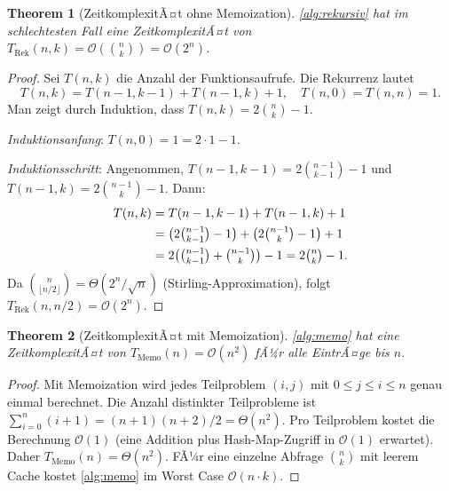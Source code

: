 ﻿\documentclass[12pt, a4paper]{article}
\newcommand{\Oh}{\mathcal{O}}
\theoremstyle{plain}
\newtheorem{theorem}{Theorem}[section]
\theoremstyle{definition}
\theoremstyle{remark}
\renewcommand{\Oh}{\mathcal{O}}
\begin{document}
\begin{theorem}[ZeitkomplexitÃ¤t ohne Memoization]
  \label{thm:rekursiv_zeit}
  \cref{alg:rekursiv} hat im schlechtesten Fall eine ZeitkomplexitÃ¤t
  von $T_{\text{Rek}}(n, k) = \Oh\!\left(\binom{n}{k}\right) = \Oh(2^n)$.
\end{theorem}

\begin{proof}
  Sei $T(n, k)$ die Anzahl der Funktionsaufrufe. Die Rekurrenz lautet
  \begin{equation}
    T(n, k) = T(n-1, k-1) + T(n-1, k) + 1,
    \quad T(n, 0) = T(n, n) = 1.
  \end{equation}
  Man zeigt durch Induktion, dass $T(n, k) = 2\binom{n}{k} - 1$.

  \emph{Induktionsanfang}: $T(n, 0) = 1 = 2 \cdot 1 - 1$. \checkmark

  \emph{Induktionsschritt}: Angenommen, $T(n-1, k-1) = 2\binom{n-1}{k-1} - 1$
  und $T(n-1, k) = 2\binom{n-1}{k} - 1$. Dann:
  \begin{align}
    T(n, k) &= T(n-1, k-1) + T(n-1, k) + 1 \notag\\
            &= \bigl(2\tbinom{n-1}{k-1} - 1\bigr)
             + \bigl(2\tbinom{n-1}{k} - 1\bigr) + 1 \notag\\
            &= 2\bigl(\tbinom{n-1}{k-1} + \tbinom{n-1}{k}\bigr) - 1
             = 2\tbinom{n}{k} - 1.
  \end{align}
  Da $\binom{n}{\lfloor n/2 \rfloor} = \Theta(2^n / \sqrt{n})$
  (Stirling-Approximation), folgt $T_{\text{Rek}}(n, n/2) = \Oh(2^n)$.
\end{proof}

\begin{theorem}[ZeitkomplexitÃ¤t mit Memoization]
  \label{thm:memo_zeit}
  \cref{alg:memo} hat eine ZeitkomplexitÃ¤t von
  $T_{\text{Memo}}(n) = \Oh(n^2)$ fÃ¼r \emph{alle} EintrÃ¤ge bis $n$.
\end{theorem}

\begin{proof}
  Mit Memoization wird jedes Teilproblem $(i, j)$ mit
  $0 \le j \le i \le n$ genau einmal berechnet. Die Anzahl
  distinkter Teilprobleme ist $\sum_{i=0}^{n}(i+1) = (n+1)(n+2)/2 = \Theta(n^2)$.
  Pro Teilproblem kostet die Berechnung $\Oh(1)$ (eine Addition plus
  Hash-Map-Zugriff in $\Oh(1)$ erwartet). Daher $T_{\text{Memo}}(n) = \Theta(n^2)$.
  FÃ¼r eine einzelne Abfrage $\binom{n}{k}$ mit leerem Cache kostet
  \cref{alg:memo} im Worst Case $\Oh(n \cdot k)$.
\end{proof}
\end{document}
